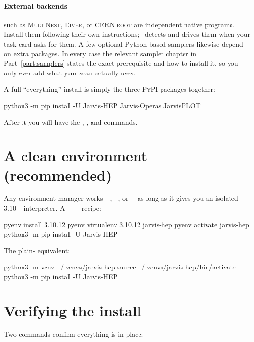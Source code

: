 \paragraph{External backends} such as \textsc{MultiNest}, \textsc{Diver}, or CERN
\textsc{root} are independent native programs. Install them following their own
instructions; \Jarvis\ detects and drives them when your task card asks for them. A few
optional Python-based samplers likewise depend on extra packages. In every case the relevant
sampler chapter in Part~\ref{part:samplers} states the exact prerequisite and how to install
it, so you only ever add what your scan actually uses.

\begin{jnote}
A full ``everything'' install is simply the three \textsc{PyPI} packages together:
\begin{shellbox}
python3 -m pip install -U Jarvis-HEP Jarvis-Operas JarvisPLOT
\end{shellbox}
After it you will have the , , and  commands.
\end{jnote}

\section{A clean environment (recommended)}
\label{sec:clean-env}

Any environment manager works---, , , or ---as
long as it gives you an isolated 3.10+ interpreter. A ~+~
recipe:

\begin{shellbox}
pyenv install 3.10.12
pyenv virtualenv 3.10.12 jarvis-hep
pyenv activate jarvis-hep
python3 -m pip install -U Jarvis-HEP
\end{shellbox}

\noindent The plain- equivalent:

\begin{shellbox}
python3 -m venv ~/.venvs/jarvis-hep
source ~/.venvs/jarvis-hep/bin/activate
python3 -m pip install -U Jarvis-HEP
\end{shellbox}

\section{Verifying the install}
\label{sec:verify}

Two commands confirm everything is in place:

